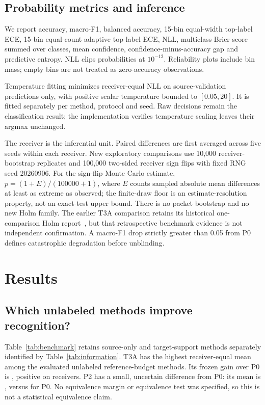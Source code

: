 \subsection{Probability metrics and inference}
We report accuracy, macro-F1, balanced accuracy, 15-bin equal-width top-label ECE, 15-bin equal-count adaptive top-label ECE, NLL, multiclass Brier score summed over classes, mean confidence, confidence-minus-accuracy gap and predictive entropy. NLL clips probabilities at $10^{-12}$. Reliability plots include bin mass; empty bins are not treated as zero-accuracy observations.

Temperature fitting minimizes receiver-equal NLL on source-validation predictions only, with positive scalar temperature bounded to $[0.05,20]$. It is fitted separately per method, protocol and seed. Raw decisions remain the classification result; the implementation verifies temperature scaling leaves their argmax unchanged.

The receiver is the inferential unit. Paired differences are first averaged across five seeds within each receiver. New exploratory comparisons use 10,000 receiver-bootstrap replicates and 100,000 two-sided receiver sign flips with fixed RNG seed 20260906. For the sign-flip Monte Carlo estimate, $p=(1+E)/(100000+1)$, where $E$ counts sampled absolute mean differences at least as extreme as observed; the finite-draw floor is an estimate-resolution property, not an exact-test upper bound. There is no packet bootstrap and no new Holm family. The earlier T3A comparison retains its historical one-comparison Holm report~\cite{holm}, but that retrospective benchmark evidence is not independent confirmation. A macro-F1 drop strictly greater than 0.05 from P0 defines catastrophic degradation before unblinding.

\section{Results}
\subsection{Which unlabeled methods improve recognition?}
Table~\ref{tab:benchmark} retains source-only and target-support methods separately identified by Table~\ref{tab:information}. T3A has the highest receiver-equal mean among the evaluated unlabeled reference-budget methods. Its frozen gain over P0 is , positive on  receivers. P2 has a small, uncertain difference from P0: its mean is , versus  for P0. No equivalence margin or equivalence test was specified, so this is not a statistical equivalence claim.

